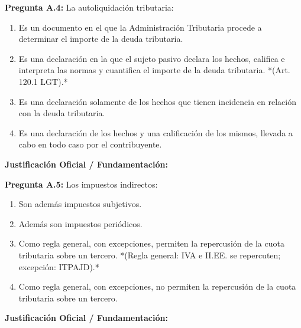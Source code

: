 \documentclass[11pt,a4paper,openany]{article}
\begin{document}
\noindent\textbf{\sffamily Pregunta A.4:} La autoliquidación tributaria:\\[0.15cm]
\begin{enumerate}[label=\textbf{\alph*)},leftmargin=1.8em,itemsep=1.5pt,topsep=2pt,partopsep=0pt,parsep=0pt]
    \item Es un documento en el que la Administración Tributaria procede a determinar el importe de la deuda tributaria.
    \item Es una declaración en la que el sujeto pasivo declara los hechos, califica e interpreta las normas y cuantifica el importe de la deuda tributaria. *(Art. 120.1 LGT).*
    \item Es una declaración solamente de los hechos que tienen incidencia en relación con la deuda tributaria.
    \item Es una declaración de los hechos y una calificación de los mismos, llevada a cabo en todo caso por el contribuyente.
\end{enumerate}
\begin{solucionBox}
\textbf{Justificación Oficial / Fundamentación:}\\[0.1cm]

\end{solucionBox}
\vspace{0.35cm}

\noindent\textbf{\sffamily Pregunta A.5:} Los impuestos indirectos:\\[0.15cm]
\begin{enumerate}[label=\textbf{\alph*)},leftmargin=1.8em,itemsep=1.5pt,topsep=2pt,partopsep=0pt,parsep=0pt]
    \item Son además impuestos subjetivos.
    \item Además son impuestos periódicos.
    \item Como regla general, con excepciones, permiten la repercusión de la cuota tributaria sobre un tercero. *(Regla general: IVA e II.EE. se repercuten; excepción: ITPAJD).*
    \item Como regla general, con excepciones, no permiten la repercusión de la cuota tributaria sobre un tercero.
\end{enumerate}
\begin{solucionBox}
\textbf{Justificación Oficial / Fundamentación:}\\[0.1cm]

\end{solucionBox}
\vspace{0.35cm}
\end{document}
